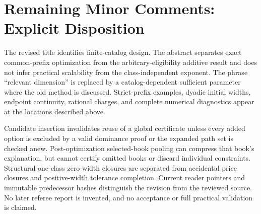 \section{Remaining Minor Comments: Explicit Disposition}
The revised title identifies finite-catalog design. The abstract separates exact common-prefix optimization from the arbitrary-eligibility additive result and does not infer practical scalability from the class-independent exponent. The phrase ``relevant dimension'' is replaced by a catalog-dependent sufficient parameter where the old method is discussed. Strict-prefix examples, dyadic initial widths, endpoint continuity, rational charges, and complete numerical diagnostics appear at the locations described above.

Candidate insertion invalidates reuse of a global certificate unless every added option is excluded by a valid dominance proof or the expanded path set is checked anew. Post-optimization selected-book pooling can compress that book's explanation, but cannot certify omitted books or discard individual constraints. Structural one-class zero-width closures are separated from accidental price closures and positive-width tolerance completion. Current reader pointers and immutable predecessor hashes distinguish the revision from the reviewed source. No later referee report is invented, and no acceptance or full practical validation is claimed.
